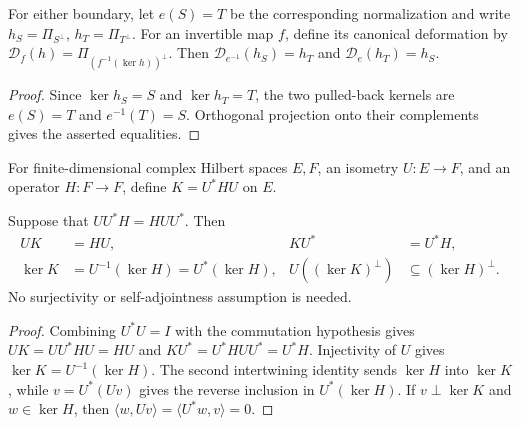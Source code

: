 \begin{lemma}
    \label{thm:mpo_joint_edge_deformed_constraints}
    \leanok
    For either boundary, let $e(S)=T$ be the corresponding normalization
    and write $h_S=\Pi_{S^\perp}$, $h_T=\Pi_{T^\perp}$.
    For an invertible map $f$, define its canonical deformation by
    $\mathcal D_f(h)=\Pi_{(f^{-1}(\ker h))^\perp}$. Then
    $\mathcal D_{e^{-1}}(h_S)=h_T$ and
    $\mathcal D_e(h_T)=h_S$.
\end{lemma}
\begin{proof}
    \leanok
    Since $\ker h_S=S$ and $\ker h_T=T$, the two pulled-back kernels
    are $e(S)=T$ and $e^{-1}(T)=S$. Orthogonal projection onto their
    complements gives the asserted equalities.
\end{proof}

\begin{definition}
    \label{def:mpo_rectangular_compression}
    \leanok
    For finite-dimensional complex Hilbert spaces $E,F$, an isometry
    $U:E\to F$, and an operator $H:F\to F$, define $K=U^*HU$ on $E$.
\end{definition}

\begin{lemma}
    \label{thm:mpo_rectangular_compression_intertwines}
    \leanok
    Suppose that $UU^*H=HUU^*$. Then
    \begin{align}
        UK                & =HU,                         & KU^* & =U^*H, \\
        \ker K            & =U^{-1}(\ker H)=U^*(\ker H), &
        U((\ker K)^\perp) & \subseteq(\ker H)^\perp.
    \end{align}
    No surjectivity or self-adjointness assumption is needed.
\end{lemma}
\begin{proof}
    \leanok
    Combining $U^*U=I$ with the commutation hypothesis gives
    $UK=UU^*HU=HU$ and $KU^*=U^*HUU^*=U^*H$.
    Injectivity of $U$ gives $\ker K=U^{-1}(\ker H)$.
    The second intertwining identity sends $\ker H$ into $\ker K$,
    while $v=U^*(Uv)$ gives the reverse inclusion in $U^*(\ker H)$.
    If $v\perp\ker K$ and $w\in\ker H$, then
    $\langle w,Uv\rangle=\langle U^*w,v\rangle=0$.
\end{proof}

